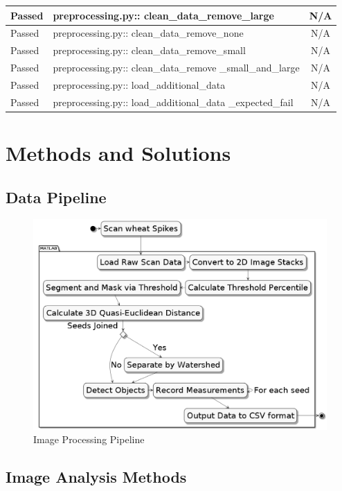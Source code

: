 \documentclass[11pt]{report}
\begin{document}
\begin{longtable}{|l|p{4.4cm}|C|}
\hline
\color{ForestGreen}Passed & preprocessing.py:: clean\_data\_remove\_large & N/A\\
\hline
\color{ForestGreen}Passed & preprocessing.py:: clean\_data\_remove\_none & N/A\\
\hline
\color{ForestGreen}Passed & preprocessing.py:: clean\_data\_remove\_small & N/A\\
\hline
\color{ForestGreen}Passed & preprocessing.py:: clean\_data\_remove \_small\_and\_large & N/A\\
\hline
\color{ForestGreen}Passed & preprocessing.py:: load\_additional\_data & N/A\\
\hline
\color{ForestGreen}Passed & preprocessing.py:: load\_additional\_data \_expected\_fail & N/A\\
\hline
\end{longtable}

\chapter{Methods and Solutions}
\label{sec:org30b71fc}
\section{Data Pipeline}
\label{sec:org8236224}

\begin{figure}[htbp]
\centering
\includegraphics[width=13cm]{./images/matlab.png}
\caption{\label{fig:org5ee2cbc}
Image Processing Pipeline}
\end{figure}

\section{Image Analysis Methods}
\label{sec:orgf123d4e}
\end{document}
